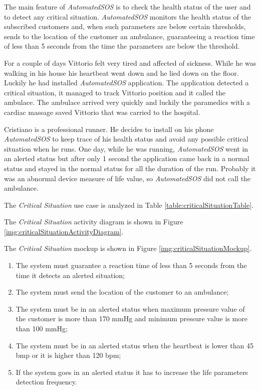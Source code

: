 The main feature of \textit{AutomatedSOS} is to check the health status of the user and to detect any critical situation.
\textit{AutomatedSOS} monitors the health status of the subscribed customers and, when such parameters are below certain thresholds, sends to the location of the customer an ambulance, guaranteeing a reaction time of less than 5 seconds from the time the parameters are below the threshold.

For a couple of days Vittorio felt very tired and affected of sickness. While he was walking in his house his heartbeat went down and he lied down on the floor. Luckily he had installed \textit{AutomatedSOS} application.
The application detected a critical situation, it managed to track Vittorio position and it called the ambulace.
The ambulace arrived very quickly and luckily the paramedics with a cardiac massage saved Vittorio that was carried to the hospital.

Cristiano is a professional runner. He decides to install on his phone \textit{AutomatedSOS} to keep trace of his health status and avoid any possible critical situation when he runs.
One day, while he was running, \textit{AutomatedSOS} went in an alerted status but after only 1 second the application came back in a normal status and stayed in the normal status for all the duration of the run.
Probably it was an abnormal device measure of life value, so \textit{AutomatedSOS} did not call the ambulance.

The \textit{Critical Situation} use case is analyzed in Table \ref{table:criticalSituationTable}.

The \textit{Critical Situation} activity diagram is shown in Figure \ref{img:criticalSituationActivityDiagram}.

The \textit{Critical Situation} mockup is shown in Figure \ref{img:criticalSituationMockup}.

\begin{enumerate}
  \item The system must guarantee a reaction time of less than 5 seconds from the time it detects an alerted situation;
  \item The system must send the location of the customer to an ambulance;
  \item The system must be in an alerted status when maximum pressure value of the customer is more than 170 mmHg and minimum pressure value is more than 100 mmHg;
  \item The system must be in an alerted status when the heartbeat is lower than 45 bmp or it is higher than 120 bpm;
  \item If the system goes in an alerted status it has to increase the life parameters detection frequency.
\end{enumerate}

